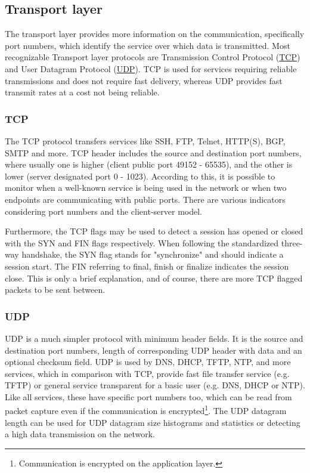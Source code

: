 \documentclass[12pt,a4paper,twoside]{book}
\begin{document}
        \subsection{Transport layer} \label{analysis:data:transport}
            The transport layer provides more information on the communication, specifically port numbers, which identify the service over which data is transmitted. Most recognizable Transport layer protocols are Transmission Control Protocol (\hyperref[analysis:data:transport:tcp]{TCP}) and User Datagram Protocol (\hyperref[analysis:data:transport:udp]{UDP}). TCP is used for services requiring reliable transmissions and does not require fast delivery, whereas UDP provides fast transmit rates at a cost not being reliable.
            \subsubsection{TCP} \label{analysis:data:transport:tcp}
                The TCP protocol transfers services like SSH, FTP, Telnet, HTTP(S), BGP, SMTP and more. TCP header includes the source and destination port numbers, where usually one is higher (client public port 49152 - 65535), and the other is lower (server designated port 0 - 1023). According to this, it is possible to monitor when a well-known service is being used in the network or when two endpoints are communicating with public ports. There are various indicators considering port numbers and the client-server model.\par
                Furthermore, the TCP flags may be used to detect a session has opened or closed with the SYN and FIN flags respectively. When following the standardized three-way handshake, the SYN flag stands for "synchronize" and should indicate a session start. The FIN referring to final, finish or finalize indicates the session close. This is only a brief explanation, and of course, there are more TCP flagged packets to be sent between.
            \subsubsection{UDP} \label{analysis:data:transport:udp}
                UDP is a much simpler protocol with minimum header fields. It is the source and destination port numbers, length of corresponding UDP header with data and an optional checksum field. UDP is used by DNS, DHCP, TFTP, NTP, and more services, which in comparison with TCP, provide fast file transfer service (e.g. TFTP) or general service transparent for a basic user (e.g. DNS, DHCP or NTP). Like all services, these have specific port numbers too, which can be read from packet capture even if the communication is encrypted\footnote{Communication is encrypted on the application layer.}. The UDP datagram length can be used for UDP datagram size histograms and statistics or detecting a high data transmission on the network.
\end{document}
